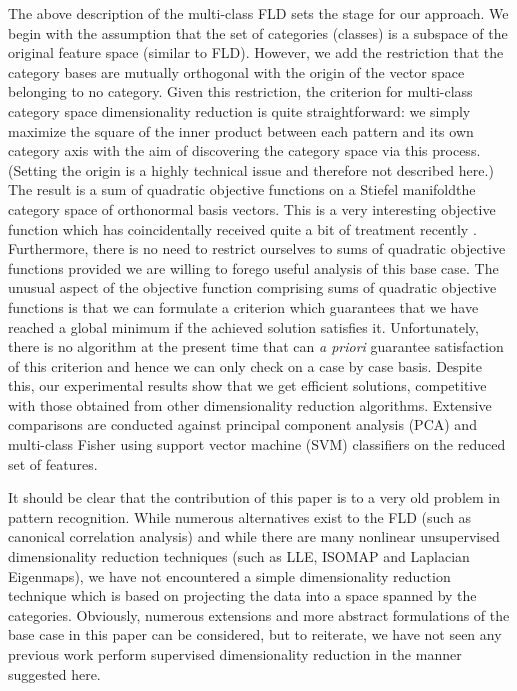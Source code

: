 The above description of the multi-class FLD sets the stage for our
approach. We begin with the assumption that the set of categories
(classes) is a subspace of the original feature space (similar to
FLD). However, we add the restriction that the category bases are
mutually orthogonal with the origin of the vector space belonging
to no category. Given this restriction, the criterion for multi-class
category space dimensionality reduction is quite straightforward:
we simply maximize the square of the inner product between each pattern
and its own category axis with the aim of discovering the category
space via this process. (Setting the origin is a highly technical
issue and therefore not described here.) The result is a sum of quadratic
objective functions on a Stiefel manifold\textemdash the category
space of orthonormal basis vectors. This is a very interesting objective
function which has coincidentally received quite a bit of treatment
recently \citep{Rapcsak2002,BollaMichaletzkyTusnadyEtAl1998}. Furthermore,
there is no need to restrict ourselves to sums of quadratic objective
functions provided we are willing to forego useful analysis of this
base case. The unusual aspect of the objective function comprising
sums of quadratic objective functions is that we can formulate a criterion
which guarantees that we have reached a global minimum if the achieved
solution satisfies it. Unfortunately, there is no algorithm at the
present time that can \emph{a priori} guarantee satisfaction of this
criterion and hence we can only check on a case by case basis. Despite
this, our experimental results show that we get efficient solutions,
competitive with those obtained from other dimensionality reduction
algorithms. Extensive comparisons are conducted against principal
component analysis (PCA) and multi-class Fisher using support vector
machine (SVM) classifiers on the reduced set of features. 

It should be clear that the contribution of this paper is to a very
old problem in pattern recognition. While numerous alternatives exist
to the FLD (such as canonical correlation analysis) and while there
are many nonlinear unsupervised dimensionality reduction techniques
(such as LLE, ISOMAP and Laplacian Eigenmaps), we have not encountered
a simple dimensionality reduction technique which is based on projecting
the data into a space spanned by the categories. Obviously, numerous
extensions and more abstract formulations of the base case in this
paper can be considered, but to reiterate, we have not seen any previous
work perform supervised dimensionality reduction in the manner suggested
here. 
